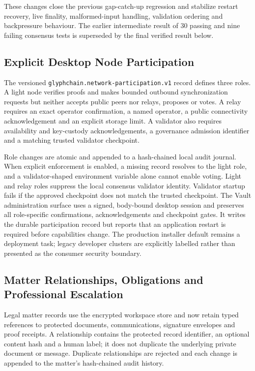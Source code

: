 These changes close the previous gap-catch-up regression and stabilize restart
recovery, live finality, malformed-input handling, validation ordering and
backpressure behaviour.  The earlier intermediate result of 30 passing and nine
failing consensus tests is superseded by the final verified result below.

\subsection{Explicit Desktop Node Participation}

The versioned \texttt{glyphchain.network-participation.v1} record defines three
roles.  A light node verifies proofs and makes bounded outbound synchronization
requests but neither accepts public peers nor relays, proposes or votes.  A
relay requires an exact operator confirmation, a named operator, a public
connectivity acknowledgement and an explicit storage limit.  A validator also
requires availability and key-custody acknowledgements, a governance admission
identifier and a matching trusted validator checkpoint.

Role changes are atomic and appended to a hash-chained local audit journal.
When explicit enforcement is enabled, a missing record resolves to the light
role, and a validator-shaped environment variable alone cannot enable voting.
Light and relay roles suppress the local consensus validator identity.
Validator startup fails if the approved checkpoint does not match the trusted
checkpoint.  The Vault administration surface uses a signed, body-bound desktop
session and preserves all role-specific confirmations, acknowledgements and
checkpoint gates.  It writes the durable participation record but reports that
an application restart is required before capabilities change.  The production
installer default remains a deployment task; legacy developer clusters are
explicitly labelled rather than presented as the consumer security boundary.

\subsection{Matter Relationships, Obligations and Professional Escalation}

Legal matter records use the encrypted workspace store and now retain typed
references to protected documents, communications, signature envelopes and
proof receipts.  A relationship contains the protected record identifier, an
optional content hash and a human label; it does not duplicate the underlying
private document or message.  Duplicate relationships are rejected and each
change is appended to the matter's hash-chained audit history.

